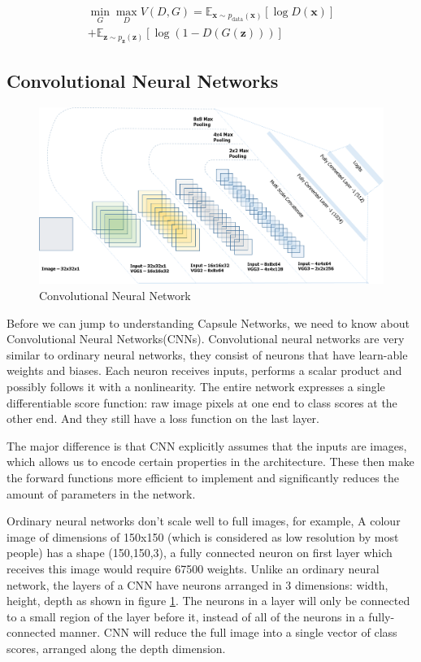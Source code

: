 \documentclass{vldb}
\begin{document}
\begin{multline} \label{eu_eqn}
\min_{G} \max_{D} V(D, G)=\mathbb{E}_{\bm{x} \sim p_{\text{data}}(\bm{x})}[\log D(\bm{x})]\\
+\mathbb{E}_{\bm{z} \sim p_{\bm{z}}(\bm{z})}[\log (1 - D(G(\bm{z})))]
\end{multline}


\subsection{Convolutional Neural Networks}
\begin{figure}[H]
\centering\includegraphics[width=\linewidth]{../Final_Report/images/CNN.png}
\caption{Convolutional Neural Network}
\label{fig:cnn}
\end{figure}
Before we can jump to understanding Capsule Networks, we need to know about Convolutional Neural Networks(CNNs). Convolutional neural networks are very similar to ordinary neural networks, they consist of neurons that have learn-able weights and biases. Each neuron receives inputs, performs a scalar product and possibly follows it with a nonlinearity. The entire network expresses a single differentiable score function: raw image pixels at one end to class scores at the other end. And they still have a loss function on the last layer.\par\bigskip
The major difference is that CNN explicitly assumes that the inputs are images, which allows us to encode certain properties in the architecture. These then make the forward functions more efficient to implement and significantly reduces the amount of parameters in the network.\par\bigskip
Ordinary neural networks don’t scale well to full images, for example, A colour image of dimensions of 150x150 (which is considered as low resolution by most people) has a shape (150,150,3), a fully connected neuron on first layer which receives this image would require 67500 weights. Unlike an ordinary neural network, the layers of a CNN have neurons arranged in 3 dimensions: width, height, depth as shown in figure \ref{fig:cnn}. The neurons in a layer will only be connected to a small region of the layer before it, instead of all of the neurons in a fully-connected manner. CNN  will reduce the full image into a single vector of class scores, arranged along the depth dimension.\par\bigskip
\end{document}
